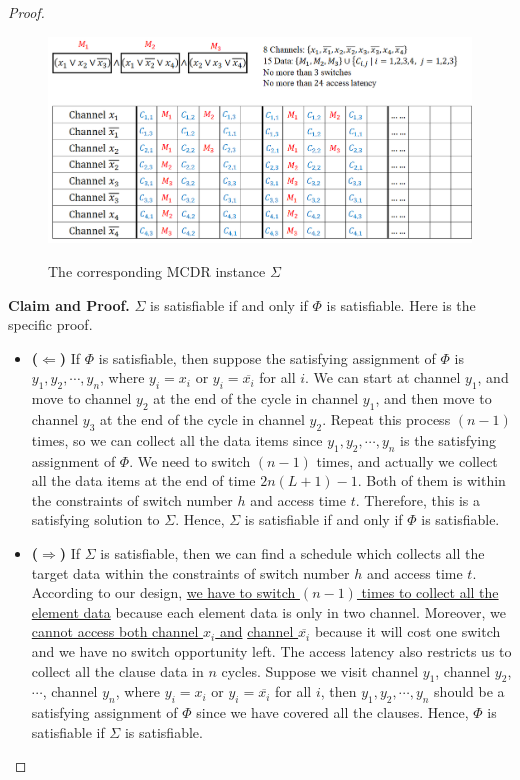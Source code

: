 \documentclass[12pt,a4paper]{article}
\theoremstyle{definition}
\begin{document}
\begin{enumerate}
\begin{proof}
    \begin{figure}[h]
      \centering
      \includegraphics[width=7in]{MCDR-instance.png}\\
      \caption{The corresponding MCDR instance $\Sigma$}\label{fig: MCDR-instance}
    \end{figure}
    
    \textbf{Claim and Proof.} $\Sigma$ is satisfiable if and only if $\Phi$ is satisfiable. Here is the specific proof.
    \begin{itemize}
    \item \textbf{($\Longleftarrow$)} If $\Phi$ is satisfiable, then suppose the satisfying assignment of $\Phi$ is $y_1, y_2, \cdots, y_n$, where $y_i = x_i$ or $y_i = \overline{x_i}$ for all $i$. We can start at channel $y_1$, and move to channel $y_2$ at the end of the cycle in channel $y_1$, and then move to channel $y_3$ at the end of the cycle in channel $y_2$. Repeat this process $(n-1)$ times, so we can collect all the data items since $y_1, y_2, \cdots, y_n$ is the satisfying assignment of $\Phi$. We need to switch $(n-1)$ times, and actually we collect all the data items at the end of time $2n(L+1) - 1$. Both of them is within the constraints of switch number $h$ and access time $t$. Therefore, this is a satisfying solution to $\Sigma$. Hence, $\Sigma$ is satisfiable if and only if $\Phi$ is satisfiable.
    \item \textbf{($\Longrightarrow$)} If $\Sigma$ is satisfiable, then we can find a schedule which collects all the target data within the constraints of switch number $h$ and access time $t$. According to our design, \underline{we have to switch $(n-1)$ times to collect all the element data} because each element data is only in two channel. Moreover, we \underline{cannot access both channel $x_i$ and} \underline{channel $\overline{x_i}$} because it will cost one switch and we have no switch opportunity left. The access latency also restricts us to collect all the clause data in $n$ cycles. Suppose we visit channel $y_1$, channel $y_2$, $\cdots$, channel $y_n$, where $y_i = x_i$ or $y_i = \overline{x_i}$ for all $i$, then $y_1, y_2, \cdots, y_n$ should be a satisfying assignment of $\Phi$ since we have covered all the clauses. Hence, $\Phi$ is satisfiable if $\Sigma$ is satisfiable.
    \end{itemize}
    

\end{proof}
\end{enumerate}
\end{document}
